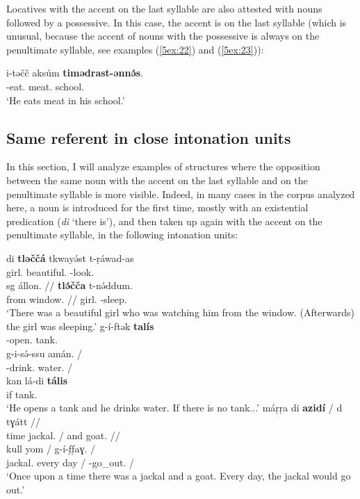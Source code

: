 \documentclass[output=paper]{langsci/langscibook}
\begin{document}
Locatives with the accent on the last syllable are also attested with nouns followed by a possessive. In this case, the accent is on the last syllable (which is unusual, because the accent of nouns with the possessive is always on the penultimate syllable, see examples (\ref{5ex:22}) and (\ref{5ex:23})):

\begin{exe}
\ex\label{5ex:41}
\gll	i-təčč	aksúm	{\bf{timədrast-ənnə́s}}. \\
	{}-eat.{}	meat.{}	school.{} \\
\glt	`He eats meat in his school.'
\end{exe}


\subsection{Same referent in close intonation units}\label{5sec:25}

In this section, I will analyze examples of structures where the opposition between the same noun with the accent on the last syllable and on the penultimate syllable is more visible. Indeed, in many cases in the corpus analyzed here, a noun is introduced for the first time, mostly with an existential predication ({\emph{di}} `there is'), and then taken up again with the accent on the penultimate syllable, in the following intonation units:

\begin{exe}
\ex\label{5ex:43}
\gll	di	{\bf{tləččá}}	tkwayə́st	t-ṛáwad-as \\
	{}	girl.{}	beautiful.{}	{}-look.{} \\
\glt
\exi{}
\gll	sg	állon.	 //	{\bf{tlə́čča}}	t-nə́ddum. \\
	from	window.{}	//	girl.{}	{}-sleep.{} \\
\glt	`There was a beautiful girl who was watching him from the window. (Afterwards) the girl was sleeping.'
\ex\label{5ex:44}
\gll 	g-í-ftək	{\bf{talís}} \\
	{}-open.{}	tank.{} \\
\glt
\exi{}
\gll	g-i-sə́-ssu	amán.	/ \\
	{}-drink.{}	water.{}	/ \\
\glt
\exi{}
\gll	kan	lá-di	{\bf{tális}} \\
	if	{}	tank.{} \\
\glt	`He opens a tank and he drinks water. If there is no tank...'
\ex\label{5ex:45}
\gll	máṛṛa	di	{\bf{azidí}}	/	d	tɣátt	// \\
	time	{}  jackal.{}	/	and	goat.{}	// \\
\glt
\exi{}
	kull	yom	/	g-í-f̣f̣aɣ.	/ \\
	jackal.{}	every	day	/	{}-go\_out.{}	/ \\
\glt	`Once upon a time there was a jackal and a goat. Every day, the jackal would go out.'
\end{exe}
\end{document}
